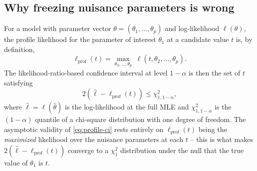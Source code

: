 \subsection{Why freezing nuisance parameters is wrong}
\label{sec:naive-wrong}

For a model with parameter vector $\theta=(\theta_1,\dots,\theta_p)$
and log-likelihood $\ell(\theta)$, the profile likelihood for the
parameter of interest $\theta_1$ at a candidate value $t$ is, by
definition,
\begin{equation}
  \ell_{\mathrm{prof}}(t) = \max_{\theta_2,\dots,\theta_p} \; \ell(t,\theta_2,\dots,\theta_p).
  \label{eq:profile-def}
\end{equation}
The likelihood-ratio-based confidence interval at level $1-\alpha$ is
then the set of $t$ satisfying
\begin{equation}
  2\left(\hat\ell - \ell_{\mathrm{prof}}(t)\right) \le \chi^2_{1,1-\alpha},
  \label{eq:profile-ci}
\end{equation}
where $\hat\ell = \ell(\hat\theta)$ is the log-likelihood at the full
MLE and $\chi^2_{1,1-\alpha}$ is the $(1-\alpha)$ quantile of a
chi-square distribution with one degree of freedom. The asymptotic
validity of \eqref{eq:profile-ci} rests entirely on
$\ell_{\mathrm{prof}}(t)$ being the \emph{maximized} likelihood over the
nuisance parameters at each $t$ -- this is what makes $2(\hat\ell -
\ell_{\mathrm{prof}}(t))$ converge to a $\chi^2_1$ distribution under the
null that the true value of $\theta_1$ is $t$.

